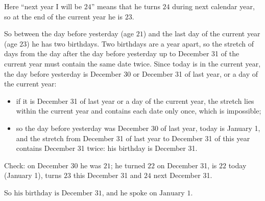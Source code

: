 Here ``next year I will be $24$'' means that he turns $24$ during next calendar year, so at the end of the current year he is $23$.

So between the day before yesterday (age $21$) and the last day of the current year (age $23$) he has two birthdays. Two birthdays are a year apart, so the stretch of days from the day after the day before yesterday up to December 31 of the current year must contain the same date twice. Since today is in the current year, the day before yesterday is December 30 or December 31 of last year, or a day of the current year:
\begin{itemize}
\item if it is December 31 of last year or a day of the current year, the stretch lies within the current year and contains each date only once, which is impossible;
\item so the day before yesterday was December 30 of last year, today is January 1, and the stretch from December 31 of last year to December 31 of this year contains December 31 twice: his birthday is December 31.
\end{itemize}
Check: on December 30 he was $21$; he turned $22$ on December 31, is $22$ today (January 1), turns $23$ this December 31 and $24$ next December 31.

So $\boxed{\text{his birthday is December 31, and he spoke on January 1}}$.
